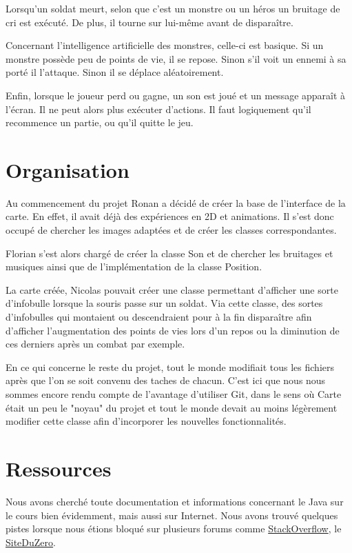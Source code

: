 \documentclass{article}
\begin{document}
Lorsqu'un soldat meurt, selon que c'est un monstre ou un héros un bruitage de cri est exécuté.
De plus, il tourne sur lui-même avant de disparaître.

Concernant l'intelligence artificielle des monstres, celle-ci est basique.
Si un monstre possède peu de points de vie, il se repose.
Sinon s'il voit un ennemi à sa porté il l'attaque.
Sinon il se déplace aléatoirement.

Enfin, lorsque le joueur perd ou gagne, un son est joué et un message apparaît à l'écran. Il ne peut alors plus exécuter d'actions.
Il faut logiquement qu'il recommence un partie, ou qu'il quitte le jeu.

\section{Organisation}
Au commencement du projet Ronan a décidé de créer la base de l'interface de la carte.
En effet, il avait déjà des expériences en 2D et animations.
Il s'est donc occupé de chercher les images adaptées et de créer les classes correspondantes.

Florian s'est alors chargé de créer la classe Son et de chercher les bruitages et musiques ainsi que de l'implémentation de la classe Position.

La carte créée, Nicolas pouvait créer une classe permettant d'afficher une sorte d'infobulle lorsque la souris passe sur un soldat.
Via cette classe, des sortes d'infobulles qui montaient ou descendraient pour à la fin disparaître afin d'afficher l'augmentation des points de vies lors d'un repos ou la diminution de ces derniers après un combat par exemple.

En ce qui concerne le reste du projet, tout le monde modifiait tous les fichiers après que l'on se soit convenu des taches de chacun.
C'est ici que nous nous sommes encore rendu compte de l'avantage d'utiliser Git, dans le sens où Carte était un peu le "noyau" du projet et tout le monde devait au moins légèrement modifier cette classe afin d'incorporer les nouvelles fonctionnalités.

\section{Ressources}
Nous avons cherché toute documentation et informations concernant le Java sur le cours bien évidemment, mais aussi sur Internet.
Nous avons trouvé quelques pistes lorsque nous étions bloqué sur plusieurs forums comme \href{http://stackoverflow.com}{StackOverflow}, le \href{http://siteduzero.com}{SiteDuZero}.
\end{document}
